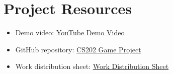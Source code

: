 \documentclass[12pt,a4paper]{article}
\begin{document}
\section{Project Resources}
\begin{itemize}
    \item Demo video: \href{https://youtu.be/97fJ6doDHdQ}{YouTube Demo Video}
    \item GitHub repository: \href{https://github.com/khanhf-ng820/CS202-GameProject}{CS202 Game Project}
    \item Work distribution sheet: \href{https://docs.google.com/spreadsheets/d/1Gdbg5CkyEm50gdGvNHR7rK6dCerKZTqORMJKWjMAijY/edit?gid=1781385760\#gid=1781385760}{Work Distribution Sheet}
\end{itemize}
\end{document}
